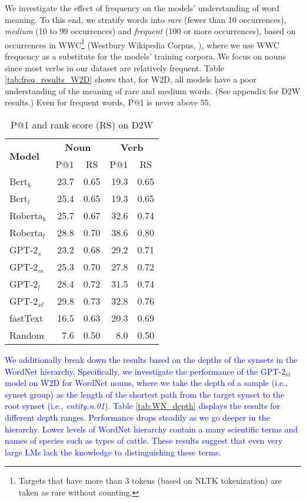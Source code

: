 \documentclass[11pt,a4paper]{article}
\begin{document}
We investigate the effect of frequency on the models' understanding of word meaning.
To this end, we stratify words into \textit{rare} (fewer than 10 occurrences), \textit{medium} (10 to 99 occurrences) and \textit{frequent} (100 or more occurrences), based on occurrences in WWC\footnote{Targets that have more than 3 tokens (based on NLTK tokenization) are taken as rare without counting.} (Westbury Wikipedia Corpus, ), where we use WWC frequency as a substitute for the models' training corpora. 
We focus on nouns since most verbs in our dataset are relatively frequent. 
Table \ref{tab:freq_results_W2D} shows that, for W2D, all models have a poor understanding of the meaning of rare and medium words. (See appendix for D2W results.) 
Even for frequent words, P@1 is never above 55.

\begin{table}
    \centering
    \begin{tabular}{l|rrrr}
        \hline
         \multirow{2}{*}{\textbf{Model}} & \multicolumn{2}{c}{\textbf{Noun}} & \multicolumn{2}{c}{\textbf{Verb}} \\
         & \multicolumn{1}{c}{P@1} & \multicolumn{1}{c}{RS} & \multicolumn{1}{c}{P@1} & \multicolumn{1}{c}{RS} \\ \hline
     Bert$_{b}$ & 23.7 & 0.65 & 19.3 & 0.65 \\
     Bert$_{l}$ & 25.4 & 0.65 & 19.3 & 0.65 \\
     Roberta$_{b}$ & 25.7 & 0.67 & 32.6 & 0.74 \\
     Roberta$_{l}$ & 28.8 & 0.70 & 38.6 & 0.80 \\ \hline
     GPT-2$_{s}$ & 23.2 & 0.68 & 29.2 & 0.71 \\
     GPT-2$_{m}$ & 25.3 & 0.70 & 27.8 & 0.72 \\
     GPT-2$_{l}$ & 28.4 & 0.72 & 31.5 & 0.74 \\
     GPT-2$_{xl}$ & 29.8 & 0.73 & 32.8 & 0.76 \\ \hline 
     fastText & 16.5 & 0.63 & 20.3 & 0.69 \\ \hline 
     Random & 7.6 & 0.50 & 8.0 & 0.50 \\\hline
     
    \end{tabular}
    \caption{P@1 and rank score (RS) on D2W}
    \label{tab:results_D2W}
\end{table}

\textcolor{blue}{We additionally break down the results based on the depths of the synsets in the WordNet hierarchy. Specifically, we investigate the performance of the GPT-2$_{xl}$ model on W2D for WordNet nouns, where we take the depth of a sample (i.e., synset group) as the length of the shortest path from the target synset to the root synset (i.e., \textit{entity.n.01}). Table \ref{tab:WN_depth} displays the results for different depth ranges. Performance drops steadily as we go deeper in the hierarchy. Lower levels of WordNet hierarchy contain a many scientific terms and names of species such as types of cattle. These results suggest that even very large LMs lack the knowledge to distinguishing these terms.}
\end{document}
